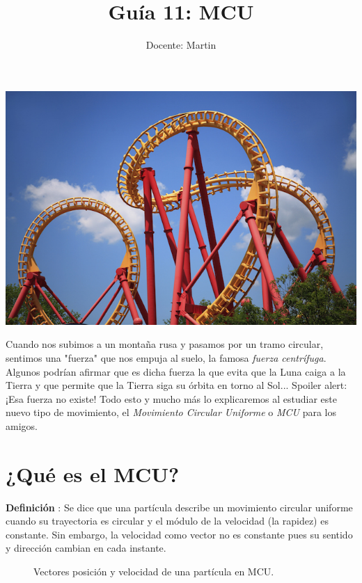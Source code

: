 \documentclass[letterpaper]{article}
\author{Docente: Martin}
\date{}
\title{\bf Guía 11: MCU}
\newcommand{\tpb}[1]{node[midway, below, sloped] {#1}}
\newcommand{\tpa}[1]{node[midway, above, sloped] {#1}}
\newcommand{\tvec}[3]{[->, thick] #1 -- #2 \tpb{#3}}
\newcommand{\tveca}[3]{[->, thick] #1 -- #2 \tpa{#3}}
\newcounter{definiciones}
\newcommand{\defii}{\stepcounter{definiciones} \textbf{Definición \thedefiniciones}: }
\newenvironment{defi}{\begin{framed} \defii}{\end{framed}}
\begin{document}
\maketitle
\thispagestyle{fancy}
\begin{center}
\includegraphics[scale=0.6]{portada.jpg}
\end{center}
\pagebreak

Cuando nos subimos a un montaña rusa y pasamos por un tramo circular, sentimos una "fuerza" que nos empuja al suelo, la famosa \emph{fuerza centrífuga}. Algunos podrían afirmar que es dicha fuerza la que evita que la Luna caiga a la Tierra y que permite que la Tierra siga su órbita en torno al Sol... Spoiler alert: ¡Esa fuerza no existe! Todo esto y mucho más lo explicaremos al estudiar este nuevo tipo de movimiento, el \emph{Movimiento Circular Uniforme} o \emph{MCU} para los amigos. 

\section*{¿Qué es el MCU?}

\begin{defi} 
Se dice que una partícula describe un movimiento circular uniforme cuando su trayectoria es circular y el módulo de la velocidad (la rapidez) es constante. Sin embargo, la velocidad como vector no es constante pues su sentido y dirección cambian en cada instante.
\end{defi}

\begin{figure}[h]
    \centering
    \caption{Vectores posición y velocidad de una partícula en MCU.}
\end{figure}
\end{document}
